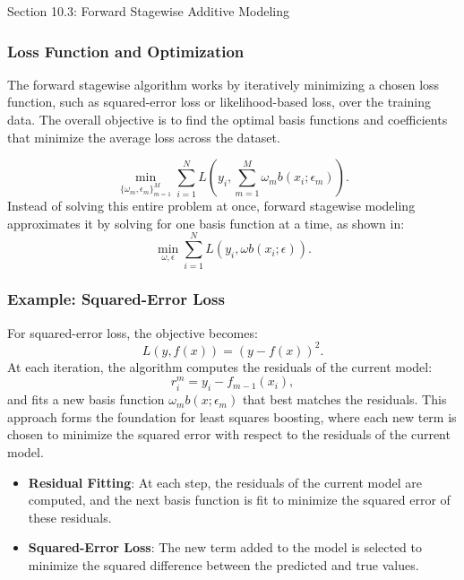 \begin{notes}{Section 10.3: Forward Stagewise Additive Modeling}
    \subsubsection*{Loss Function and Optimization}
    
    The forward stagewise algorithm works by iteratively minimizing a chosen loss function, such as squared-error loss or likelihood-based loss, over the training data. The overall objective is to 
    find the optimal basis functions and coefficients that minimize the average loss across the dataset.
    
    \begin{highlight}
        \[
        \min_{\{ \omega_m, \epsilon_m \}_{m=1}^{M}} \sum_{i=1}^{N} L\left( y_i, \sum_{m=1}^{M} \omega_m b(x_i; \epsilon_m) \right).
        \]
        Instead of solving this entire problem at once, forward stagewise modeling approximates it by solving for one basis function at a time, as shown in:
        \[
        \min_{\omega, \epsilon} \sum_{i=1}^{N} L( y_i, \omega b(x_i; \epsilon)).
        \]
    \end{highlight}
    
    \subsubsection*{Example: Squared-Error Loss}
    
    For squared-error loss, the objective becomes:
    \[
    L(y, f(x)) = (y - f(x))^2.
    \]
    At each iteration, the algorithm computes the residuals of the current model:
    \[
    r_i^m = y_i - f_{m-1}(x_i),
    \]
    and fits a new basis function $\omega_m b(x; \epsilon_m)$ that best matches the residuals. This approach forms the foundation for least squares boosting, where each new term is chosen to minimize 
    the squared error with respect to the residuals of the current model.
    
    \begin{highlight}
        \begin{itemize}
            \item \textbf{Residual Fitting}: At each step, the residuals of the current model are computed, and the next basis function is fit to minimize the squared error of these residuals.
            \item \textbf{Squared-Error Loss}: The new term added to the model is selected to minimize the squared difference between the predicted and true values.
        \end{itemize}
    \end{highlight}
    

\end{notes}
